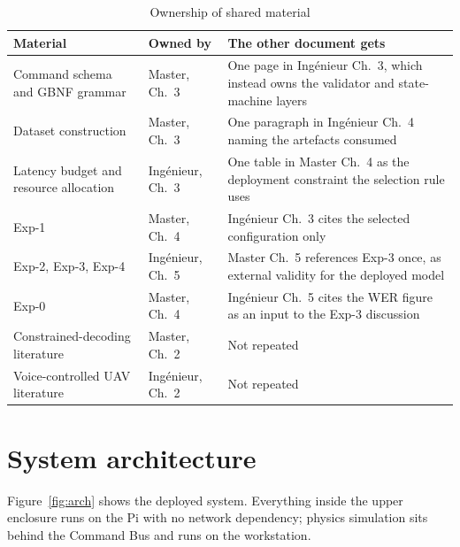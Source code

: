 \documentclass[11pt,a4paper]{article}
\begin{document}
\begin{table}[htbp]
\centering
\caption{Ownership of shared material}
\label{tab:shared}
\small
\begin{tabular}{@{}P{0.30}P{0.28}P{0.32}@{}}
\toprule
\textbf{Material} & \textbf{Owned by} & \textbf{The other document gets} \\
\midrule
Command schema and GBNF grammar & Master, Ch.~3 & One page in Ing\'enieur Ch.~3, which instead owns the
  validator and state-machine layers \\
Dataset construction & Master, Ch.~3 & One paragraph in Ing\'enieur Ch.~4 naming the artefacts consumed \\
Latency budget and resource allocation & Ing\'enieur, Ch.~3 & One table in Master Ch.~4 as the deployment
  constraint the selection rule uses \\
Exp-1 & Master, Ch.~4 & Ing\'enieur Ch.~3 cites the selected configuration only \\
Exp-2, Exp-3, Exp-4 & Ing\'enieur, Ch.~5 & Master Ch.~5 references Exp-3 once, as external validity for
  the deployed model \\
Exp-0 & Master, Ch.~4 & Ing\'enieur Ch.~5 cites the WER figure as an input to the Exp-3 discussion \\
Constrained-decoding literature & Master, Ch.~2 & Not repeated \\
Voice-controlled UAV literature & Ing\'enieur, Ch.~2 & Not repeated \\
\bottomrule
\end{tabular}
\end{table}

\section{System architecture}
\label{sec:arch}

Figure~\ref{fig:arch} shows the deployed system. Everything inside the upper enclosure runs on the Pi with
no network dependency; physics simulation sits behind the Command Bus and runs on the workstation.
\end{document}
